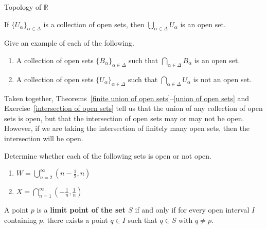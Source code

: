 \begin{section}{Topology of $\mathbb{R}$}
\begin{theorem}\label{union of open sets}
If $\{U_{\alpha}\}_{\alpha\in\Delta}$ is a collection of open sets, then $\bigcup_{\alpha\in\Delta} U_{\alpha}$ is an open set.
\end{theorem}

\begin{exercise}\label{intersection of open sets}
Give an example of each of the following.
\begin{enumerate}[label=\textrm{(\alph*)}]
\item A collection of open sets $\{B_{\alpha}\}_{\alpha\in\Delta}$ such that $\bigcap_{\alpha\in\Delta} B_{\alpha}$ is an open set.
\item A collection of open sets $\{U_{\alpha}\}_{\alpha\in\Delta}$ such that $\bigcap_{\alpha\in\Delta} U_{\alpha}$ is not an open set.
\end{enumerate}
\end{exercise}

\begin{remark}\label{rem:union vs intersection of open sets}
Taken together, Theorems~\ref{finite union of open sets}--\ref{union of open sets} and Exercise~\ref{intersection of open sets} tell us that the union of any collection of open sets is open, but that the intersection of open sets may or may not be open.  However, if we are taking the intersection of finitely many open sets, then the intersection will be open.
\end{remark}

\begin{exercise}
Determine whether each of the following sets is open or not open.
\begin{multicols}{2}
\begin{enumerate}[label=\textrm{(\alph*)}]
\item $\displaystyle W=\bigcup_{n=2}^{\infty} \left(n - \frac{1}{2},n\right)$
\item $\displaystyle X=\bigcap_{n=1}^{\infty} \left(-\frac{1}{n}, \frac{1}{n}\right)$
\end{enumerate}
\end{multicols}
\end{exercise}

\begin{definition}
A point $p$ is a \textbf{limit point of the set $S$} if and only if for every open interval $I$ containing $p$, there exists a point $q \in I$ such that $q \in S$ with $q\neq p$.
\end{definition}


\end{section}
